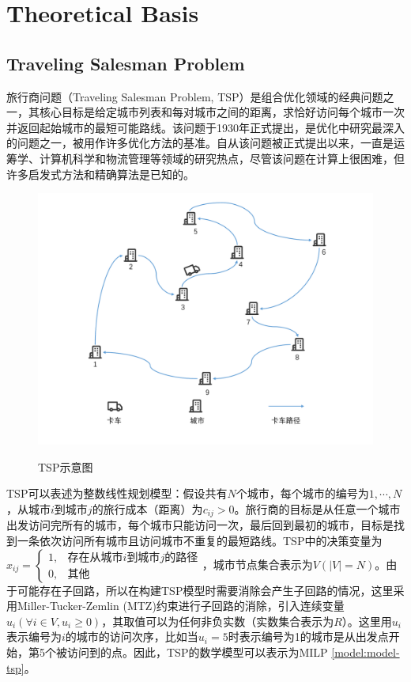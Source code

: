 \chapter{Theoretical Basis}

\section{Traveling Salesman Problem}
旅行商问题（Traveling Salesman Problem, TSP）是组合优化领域的经典问题之一，其核心目标是给定城市列表和每对城市之间的距离，求恰好访问每个城市一次并返回起始城市的最短可能路线。该问题于1930年正式提出，是优化中研究最深入的问题之一，被用作许多优化方法的基准。自从该问题被正式提出以来，一直是运筹学、计算机科学和物流管理等领域的研究热点，尽管该问题在计算上很困难，但许多启发式方法和精确算法是已知的\cite{2009A, 2012Models}。

\begin{figure}[!htb]
    \centering
    \includegraphics[width=\linewidth]{images/TSP.pdf}\\
    \caption{TSP示意图}
\end{figure}

TSP可以表述为整数线性规划模型\cite{papadimitriou1998combinatorial}：假设共有$N$个城市，每个城市的编号为$1,\cdots,N$，从城市$i$到城市$j$的旅行成本（距离）为$c_{ij}>0$。旅行商的目标是从任意一个城市出发访问完所有的城市，每个城市只能访问一次，最后回到最初的城市，目标是找到一条依次访问所有城市且访问城市不重复的最短路线。TSP中的决策变量为$x_{ij}=\begin{cases}1, & \text{存在从城市$i$到城市$j$的路径}\\0, & \text{其他} \end{cases}$，城市节点集合表示为$V(|V| = N)$。由于可能存在子回路，所以在构建TSP模型时需要消除会产生子回路的情况，这里采用Miller-Tucker-Zemlin (MTZ)约束进行子回路的消除\cite{1960Integer}，引入连续变量$u_i(\forall i \in V, u_i \geq 0)$，其取值可以为任何非负实数（实数集合表示为$R$）。这里用$u_i$表示编号为$i$的城市的访问次序，比如当$u_i = 5$时表示编号为1的城市是从出发点开始，第5个被访问到的点。因此，TSP的数学模型可以表示为MILP \ref{model:model-tsp}。

